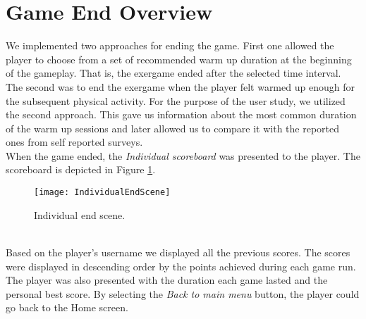 \section{Game End Overview}
We implemented two approaches for ending the game. First one allowed the player to choose from a set of recommended warm up duration at the beginning of the gameplay. That is, the exergame ended after the selected time interval. The second was to end the exergame when the player felt warmed up enough for the subsequent physical activity. For the purpose of the user study, we utilized the second approach. This gave us information about the most common duration of the warm up sessions and later allowed us to compare it with the reported ones from self reported surveys. \\When the game ended, the \textit{Individual scoreboard} was presented to the player. The scoreboard is depicted in Figure \ref{fig:individualend}.\\
\begin{figure}[h]
    \centering
    \texttt{[image: IndividualEndScene]}
    \caption{Individual end scene.}
    \label{fig:individualend}
\end{figure}\\
Based on the player's username we displayed all the previous scores. The scores were displayed in descending order by the points achieved during each game run. The player was also presented with the duration each game lasted and the personal best score. By selecting the \textit{Back to main menu} button, the player could go back to the Home screen. 
\label{endgamelabel}
